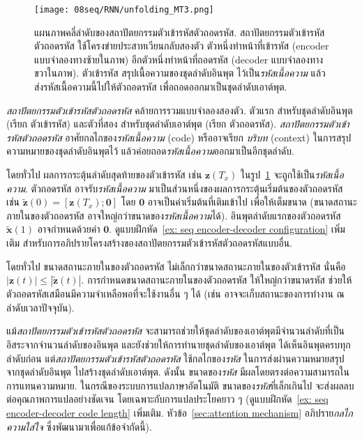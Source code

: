 \begin{figure}
	\begin{center}		
		\texttt{[image: 08seq/RNN/unfolding\_MT3.png]}	
		\caption[แผนภาพคลี่ลำดับของสถาปัตยกรรมตัวเข้ารหัสตัวถอดรหัส]{แผนภาพคลี่ลำดับของสถาปัตยกรรมตัวเข้ารหัสตัวถอดรหัส.
			สถาปัตยกรรมตัวเข้ารหัสตัวถอดรหัส ใช้โครงข่ายประสาทเวียนกลับสองตัว ตัวหนึ่งทำหน้าที่เข้ารหัส (encoder แบบจำลองทางซ้ายในภาพ) อีกตัวหนึ่งทำหน้าที่ถอดรหัส (decoder แบบจำลองทางขวาในภาพ).
			ตัวเข้ารหัส สรุปเนื้อความของชุดลำดับอินพุต ไว้เป็น\textit{รหัสเนื้อความ} แล้วส่งรหัสเนื้อความนี้ไปให้ตัวถอดรหัส เพื่อถอดออกมาเป็นชุดลำดับเอาต์พุต.			
		}
		\label{fig: rnn unfolding diagram encoder-decoder coded hidden state}
	\end{center}
\end{figure}
%

\textit{สถาปัตยกรรมตัวเข้ารหัสตัวถอดรหัส} 
คล้ายการรวมแบบจำลองสองตัว.
ตัวแรก สำหรับชุดลำดับอินพุต (เรียก ตัวเข้ารหัส)
และตัวที่สอง สำหรับชุดลำดับเอาต์พุต (เรียก ตัวถอดรหัส).
\textit{สถาปัตยกรรมตัวเข้ารหัสตัวถอดรหัส} อาศัยกลไกของ\textit{รหัสเนื้อความ} (code) หรืออาจเรียก \textit{บริบท} (context) ในการสรุปความหมายของชุดลำดับอินพุตไว้
แล้วค่อยถอด\textit{รหัสเนื้อความ}ออกมาเป็นอีกชุดลำดับ.

โดยทั่วไป ผลการกระตุ้นลำดับสุดท้ายของตัวเข้ารหัส เช่น $\bm{z}(T_x)$ ในรูป~\ref{fig: rnn unfolding diagram encoder-decoder coded hidden state} จะถูกใช้เป็น\textit{รหัสเนื้อความ}.
ตัวถอดรหัส อาจรับ\textit{รหัสเนื้อความ} มาเป็นส่วนหนึ่งของผลการกระตุ้นเริ่มต้นของตัวถอดรหัส
เช่น $\tilde{\bm{z}}(0) = [\bm{z}(T_x); \bm{0}]$ โดย $\bm{0}$ อาจเป็นค่าเริ่มต้นที่เติมเข้าไป
เพื่อให้เต็มขนาด (ขนาดสถานะภายในของตัวถอดรหัส อาจใหญ่กว่าขนาดของ\textit{รหัสเนื้อความ}ได้).
อินพุตลำดับแรกของตัวถอดรหัส $\tilde{\bm{x}}(1)$ 
อาจกำหนดด้วยค่า $\bm{0}$.
ดูแบบฝึกหัด~\ref{ex: seq encoder-decoder configuration} เพิ่มเติม สำหรับการอภิปรายโครงสร้างของสถาปัตยกรรมตัวเข้ารหัสตัวถอดรหัสแบบอื่น.

โดยทั่วไป ขนาดสถานะภายในของตัวถอดรหัส ไม่เล็กกว่าขนาดสถานะภายในของตัวเข้ารหัส 
นั่นคือ $|\bm{z}(t)| \leq |\tilde{\bm{z}}(t)|$.
การกำหนดขนาดสถานะภายในของตัวถอดรหัส ให้ใหญ่กว่าขนาดรหัส ช่วยให้ตัวถอดรหัสเสมือนมีความจำเหลือพอที่จะใช้งานอื่น ๆ ได้ (เช่น อาจจะเก็บสถานะของการทำงาน ณ ลำดับเวลาปัจจุบัน).

แม้\textit{สถาปัตยกรรมตัวเข้ารหัสตัวถอดรหัส} จะสามารถช่วยให้ชุดลำดับของเอาต์พุตมีจำนวนลำดับที่เป็นอิสระจากจำนวนลำดับของอินพุต
และยังช่วยให้การทำนายชุดลำดับของเอาต์พุต ได้เห็นอินพุตครบทุกลำดับก่อน
แต่\textit{สถาปัตยกรรมตัวเข้ารหัสตัวถอดรหัส} ใช้กลไกของ\textit{รหัส} ในการส่งผ่านความหมายสรุปจากชุดลำดับอินพุต
ไปสร้างชุดลำดับเอาต์พุต.
ดังนั้น ขนาดของ\textit{รหัส} 
มีผลโดยตรงต่อความสามารถในการแทนความหมาย.
ในกรณีของระบบการแปลภาษาอัตโนมัติ 
ขนาดของ\textit{รหัส}ที่เล็กเกินไป จะส่งผลลบต่อคุณภาพการแปลอย่างชัดเจน โดยเฉพาะกับการแปลประโยคยาว ๆ\cite{ChoEtAl2014b, BahdanauEtAl2015} (ดูแบบฝึกหัด~\ref{ex: seq encoder-decoder code length} เพิ่มเติม.
หัวข้อ~\ref{sec:attention mechanism} อภิปราย\textit{กลไกความใส่ใจ} ซึ่งพัฒนามาเพื่อแก้ข้อจำกัดนี้).

